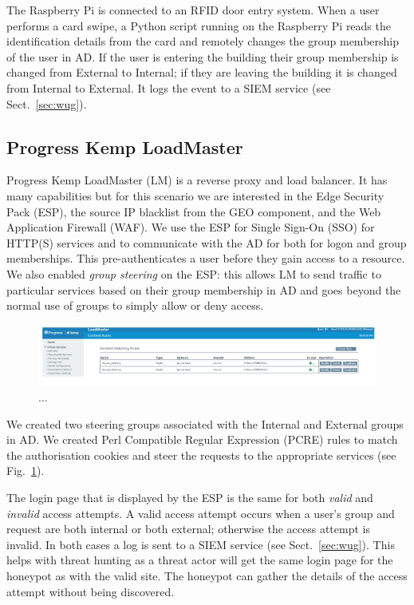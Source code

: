 The Raspberry Pi is connected to an RFID door entry system.  When a
user performs a card swipe, a Python script running on the Raspberry
Pi reads the identification details from the card and remotely changes
the group membership of the user in AD.  If the user is entering the
building their group membership is changed from External to Internal;
if they are leaving the building it is changed from Internal to
External.  It logs the event to a SIEM service (see
Sect.~\ref{sec:wug}).

\subsection{Progress Kemp LoadMaster}

Progress Kemp LoadMaster (LM) is a reverse proxy and load balancer.
It has many capabilities but for this scenario we are interested in
the Edge Security Pack (ESP), the source IP blacklist from the GEO
component, and the Web Application Firewall (WAF).  We use the ESP for
Single Sign-On (SSO) for HTTP(S) services and to communicate with the
AD for both for logon and group memberships.  This pre-authenticates a
user before they gain access to a resource.  We also enabled
\textit{group steering} on the ESP: this allows LM to send traffic to
particular services based on their group membership in AD and goes
beyond the normal use of groups to simply allow or deny access.

\begin{figure}
  \centerline{\includegraphics[width=\textwidth]{img/loadmaster-pcre-rules}}
  \caption{...}\label{fig:loadmaster-pcre-rules}
\end{figure}

We created two steering groups associated with the Internal and
External groups in AD.  We created Perl Compatible Regular Expression
(PCRE) rules to match the authorisation cookies and steer the requests
to the appropriate services (see
Fig.~\ref{fig:loadmaster-pcre-rules}).

The login page that is displayed by the ESP is the same for both
\textit{valid} and \textit{invalid} access attempts.  A valid access
attempt occurs when a user's group and request are both internal or
both external; otherwise the access attempt is invalid.  In both cases
a log is sent to a SIEM service (see Sect.~\ref{sec:wug}).  This helps
with threat hunting as a threat actor will get the same login page for
the honeypot as with the valid site.  The honeypot can gather the
details of the access attempt without being discovered.

